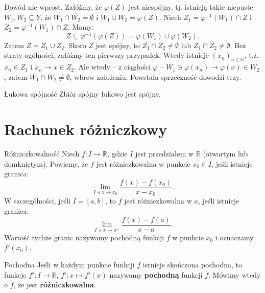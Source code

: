 \documentclass{article}
\numberwithin{defi}{section}
\numberwithin{defi}{section}
\newcommand{\R}{\mathbb{R}}
\newcommand{\N}{\mathbb{N}}
\newcommand{\se}{\subseteq}
\providecommand{\ol}{\overline}
\newcommand{\ciag}[1]{(#1_{n})_{n \in \N}}
\begin{document}
\begin{dow}
    Dowód nie wprost. Załóżmy, że $\varphi(Z)$ jest niespójny, tj. istnieją takie niepuste $W_1, W_2 \se Y$, że $W_1 \cap \ol{W_2} = \emptyset$ i $W_1 \cup W_2 = \varphi(Z)$. Niech $Z_1 = \varphi^{-1}(W_1) \cap Z$ i $Z_2 = \varphi^{-1}(W_1) \cap Z$. Mamy: \begin{equation*}
        Z \se \varphi^{-1}(\varphi(Z)) = \varphi(W_1) \cup \varphi(W_2).
    \end{equation*} Zatem $Z = Z_1 \cup Z_2$. Skoro $Z$ jest spójny, to $\ol{Z_1} \cap Z_2 \neq \emptyset$ lub $Z_1 \cap \ol{Z_2} \neq \emptyset$. Bez straty ogólności, załóżmy ten pierwszy przypadek. Wtedy istnieje $\ciag{x}$, t.ż. $x_n \in Z_1$ i $x_n \to x \in Z_2$. Ale wtedy -- z ciągłości $\varphi$ -- $W_1 \ni \varphi(x_n) \to \varphi(x) \in W_2$, zatem $\ol{W_1} \cap W_2 \neq \emptyset$, wbrew założeniu. Powstała sprzeczność dowodzi tezy.
\end{dow}

\begin{obs}{Łukowa spójność}
    Zbiór spójny łukowo jest spójny.
\end{obs}





\newpage
\section{Rachunek różniczkowy}

    \begin{defr}{Różniczkowalność}
        Niech $f: I \to \R$, gdzie $I$ jest przedziałem w $\R$ (otwartym lub domkniętym). Powiemy, że $f$ jest różniczkowalna w punkcie $x_0 \in I$, jeśli istnieje granica: \begin{equation}
            \lim_{I \ni x \to x_0} \frac{f(x) - f(x_0)}{x - x_0}.
        \end{equation} W szczególności, jeśli $I = [a, b]$, to $f$ jest różniczkowalna w $a$, jeśli istnieje granica: \begin{equation}
            \lim_{I \ni x \to a^+} \frac{f(x) - f(a)}{x - a}.
        \end{equation} Wartość tychże granic nazywamy pochodną funkcji $f$ w punkcie $x_0$ i oznaczamy $f'(x_0)$. 
    \end{defr}

    \begin{defr}{Pochodna}
        Jeśli w każdym punkcie funkcji $f$ istnieje skończona pochodna, to funkcje $f': I \to \R$, $f': x \mapsto f'(x)$ nazywamy \textbf{pochodną} funkcji $f$. Mówimy wtedy o $f$, że jest \textbf{różniczkowalna}.
    \end{defr}
\end{document}
